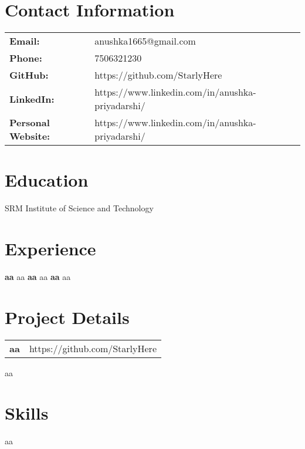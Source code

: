 \documentclass{article}
\begin{document}
\begin{center}
\end{center}

\section*{Contact Information}
\vspace*{-1em}
\noindent\hrulefill %
\newline
\begin{tabular}{@{}ll}
\textbf{Email:} & anushka1665@gmail.com \\
\textbf{Phone:} & 7506321230 \\
\textbf{GitHub:} & https://github.com/StarlyHere \\
\textbf{LinkedIn:} & https://www.linkedin.com/in/anushka-priyadarshi/ \\
\textbf{Personal Website:} & https://www.linkedin.com/in/anushka-priyadarshi/ \\
\end{tabular}

\section*{Education}
\vspace*{-1em}
\noindent\hrulefill %
\newline
SRM Institute of Science and Technology

\section*{Experience}
\vspace*{-1em}
\noindent\hrulefill %
\newline
\textbf{aa}
\newline
aa
\vspace{1em} %
\newline
\textbf{aa}
\newline
aa
\vspace{1em} %
\newline
\textbf{aa}
\newline
aa

\section*{Project Details}
\vspace*{-1em}
\noindent\hrulefill %
\newline
\begin{tabular}{@{}>{\raggedright\arraybackslash}p{} >{\raggedleft\arraybackslash}p{}@{}}
\textbf{aa} & {https://github.com/StarlyHere} \\
\end{tabular}
\newline
aa

\section*{Skills}
\vspace*{-1em}
\noindent\hrulefill %
\newline
aa
\end{document}
